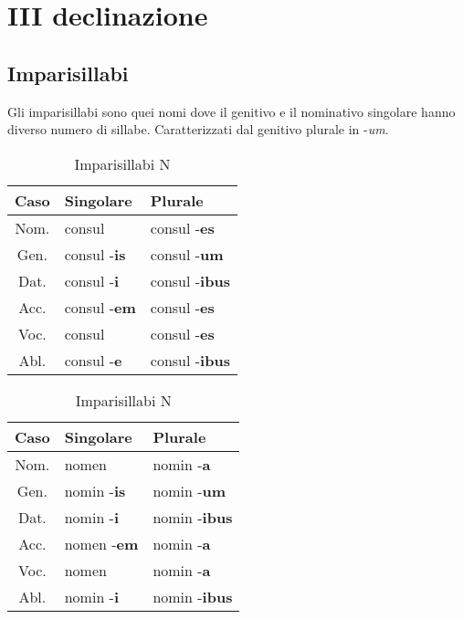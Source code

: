 \section{III declinazione}
\subsection{Imparisillabi}
Gli imparisillabi sono quei nomi dove il genitivo e il nominativo singolare hanno diverso numero di sillabe.
Caratterizzati dal genitivo plurale in -\textit{um}.
\begin{table}[h!]
    \begin{minipage}{.4\linewidth}
        \centering
        \begin{tabular}{|c|l|l|}
            \hline
            \textbf{Caso} & \textbf{Singolare} & \textbf{Plurale} \\
            \hline
            Nom. & consul              & consul -\textbf{es} \\
            \hline
            Gen. & consul -\textbf{is} & consul -\textbf{um} \\
            \hline
            Dat. & consul -\textbf{i}  & consul -\textbf{ibus} \\
            \hline
            Acc. & consul -\textbf{em} & consul -\textbf{es} \\
            \hline
            Voc. & consul              & consul -\textbf{es} \\
            \hline
            Abl. & consul -\textbf{e}  & consul -\textbf{ibus} \\
            \hline
        \end{tabular}
        \caption{Imparisillabi M \& F}
    \end{minipage}
    \hfill
    \begin{minipage}{.4\linewidth}
        \centering
        \begin{tabular}{|c|l|l|}
            \hline
            \textbf{Caso} & \textbf{Singolare} & \textbf{Plurale} \\
            \hline
            Nom. & nomen              & nomin -\textbf{a} \\
            \hline
            Gen. & nomin -\textbf{is} & nomin -\textbf{um} \\
            \hline
            Dat. & nomin -\textbf{i}  & nomin -\textbf{ibus} \\
            \hline
            Acc. & nomen -\textbf{em} & nomin -\textbf{a} \\
            \hline
            Voc. & nomen              & nomin -\textbf{a} \\
            \hline
            Abl. & nomin -\textbf{i}  & nomin -\textbf{ibus} \\
            \hline
        \end{tabular}
        \caption{Imparisillabi N}
    \end{minipage}
\end{table}

